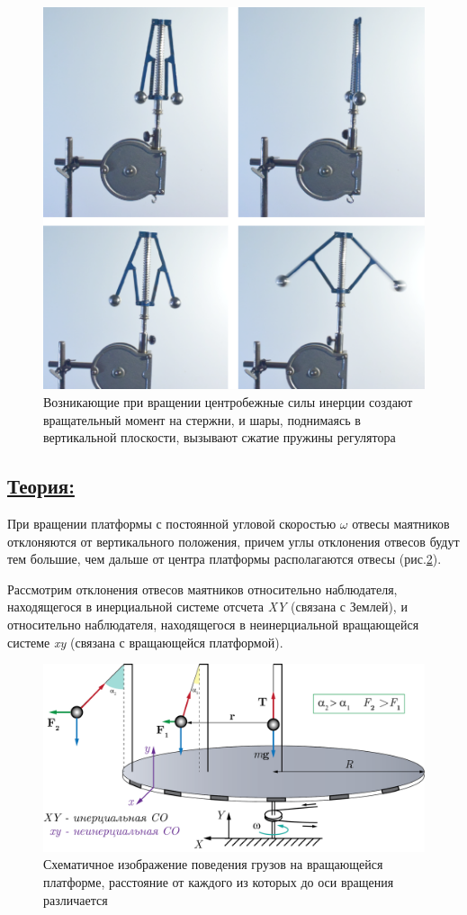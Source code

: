 \documentclass[14pt,a4paper,oneside]{extarticle}	%
\begin{document}
\begin{figure}[H] 
	\centering 		
	\includegraphics[width=0.6\linewidth]{regulator-1.png} 
	\caption{Возникающие при вращении центробежные силы инерции создают вращательный момент на стержни, и шары, поднимаясь в вертикальной плоскости, вызывают сжатие пружины регулятора}
	\label{regulator-1}
\end{figure}

\newpage
\subsection*{\underline{Теория:}}

При вращении платформы с постоянной угловой скоростью $ \omega $ отвесы маятников отклоняются от вертикального положения, причем углы отклонения отвесов будут тем большие, чем дальше от центра платформы располагаются отвесы (рис.\ref{platform-3}).

Рассмотрим отклонения отвесов маятников относительно наблюдателя, находящегося в инерциальной
системе отсчета \textit{XY} (связана с Землей), и относительно наблюдателя, находящегося в неинерциальной вращающейся системе \textit{xy} (связана с вращающейся платформой). 

\begin{figure}[H] 
	\centering 		
	\includegraphics[width=0.9\linewidth]{platform-3.png} 
	\caption{Схематичное изображение поведения грузов на вращающейся платформе, расстояние от каждого из которых до оси вращения различается}
	\label{platform-3}
\end{figure}
\end{document}
